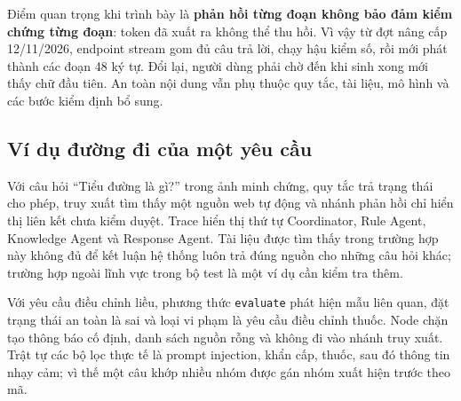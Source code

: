 Điểm quan trọng khi trình bày là \textbf{phản hồi từng đoạn không bảo đảm kiểm chứng từng đoạn}: token đã xuất ra không thể thu hồi. Vì vậy từ đợt nâng cấp 12/11/2026, endpoint stream gom đủ câu trả lời, chạy hậu kiểm số, rồi mới phát thành các đoạn 48 ký tự. Đổi lại, người dùng phải chờ đến khi sinh xong mới thấy chữ đầu tiên. An toàn nội dung vẫn phụ thuộc quy tắc, tài liệu, mô hình và các bước kiểm định bổ sung.
\subsection{Ví dụ đường đi của một yêu cầu}
Với câu hỏi “Tiểu đường là gì?” trong ảnh minh chứng, quy tắc trả trạng thái cho phép, truy xuất tìm thấy một nguồn web tự động và nhánh phản hồi chỉ hiển thị liên kết chưa kiểm duyệt. Trace hiển thị thứ tự Coordinator, Rule Agent, Knowledge Agent và Response Agent. Tài liệu được tìm thấy trong trường hợp này không đủ để kết luận hệ thống luôn trả đúng nguồn cho những câu hỏi khác; trường hợp ngoài lĩnh vực trong bộ test là một ví dụ cần kiểm tra thêm.

Với yêu cầu điều chỉnh liều, phương thức \texttt{evaluate} phát hiện mẫu liên quan, đặt trạng thái an toàn là sai và loại vi phạm là yêu cầu điều chỉnh thuốc. Node chặn tạo thông báo cố định, danh sách nguồn rỗng và không đi vào nhánh truy xuất. Trật tự các bộ lọc thực tế là prompt injection, khẩn cấp, thuốc, sau đó thông tin nhạy cảm; vì thế một câu khớp nhiều nhóm được gán nhóm xuất hiện trước theo mã.
